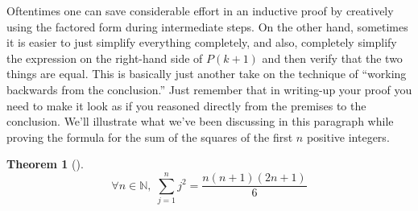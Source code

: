 \documentclass[10pt,]{book}
\theoremstyle{plain}
\newtheorem{theorem}{Theorem}[section]
\theoremstyle{definition}
\theoremstyle{definition}
\numberwithin{equation}{section}
\newcommand{\Zplus}{{\mathbb N}}
\begin{document}
    Oftentimes one can save considerable effort in an inductive
    proof by creatively using the factored form during intermediate steps.
    On the other hand, sometimes it is easier to just simplify everything
    completely, and also, completely simplify the expression on the
    right-hand side of \(P(k+1)\) and then verify that the two things are
    equal. This is basically just another take on the technique of
    ``working backwards from the conclusion.'' Just remember that
    in writing-up your proof you need to make it look as if you reasoned
    directly from the premises to the conclusion. We'll illustrate
    what we've been discussing in this paragraph while proving
    the formula for the sum of the squares of the first \(n\) positive integers.
\begin{theorem}[{}]\label{theorem-17}
\begin{equation*}
        \forall n \in \Zplus, \; \sum_{j=1}^n j^2 = \frac{n(n+1)(2n+1)}{6}
      \end{equation*}\end{theorem}
\end{document}
